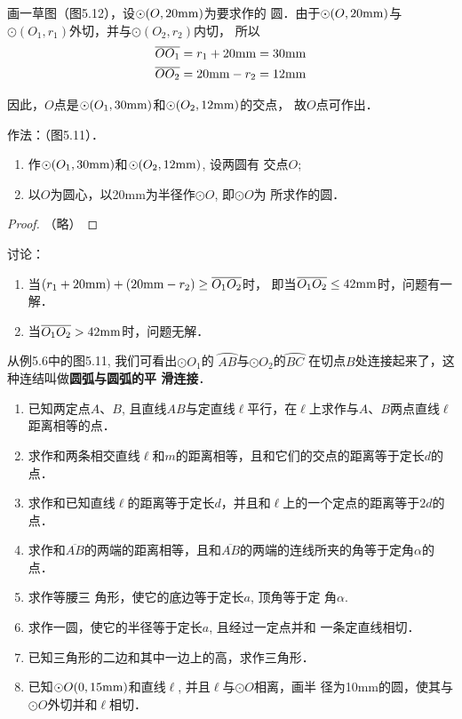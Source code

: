 \begin{analyze}
    画一草图（图5.12），设$\odot (O,20{\rm mm})$为要求作的
圆．由于$\odot (O,20{\rm mm})$与$\odot (O_1,r_1)$外切，并与$\odot (O_2,r_2)$内切，
所以
\[\begin{split}
   \overline{OO_1}&=r_1+20{\rm  mm}=30{\rm mm}\\
   \overline{OO_2}&=20{\rm  mm}-r_2=12{\rm  mm} 
\end{split}\]

因此，$O$点是$\odot (O_1,30{\rm mm})$和$\odot (O_2,12{\rm  mm})$的交点，
故$O$点可作出．
\end{analyze}

作法：（图5.11）．
\begin{enumerate}
    \item 作$\odot (O_1,30{\rm mm})$和$\odot (O_2,12{\rm mm})$, 设两圆有
交点$O$;
\item 以$O$为圆心，以20mm为半径作$\odot O$, 即$\odot O$为
所求作的圆．
\end{enumerate}

\begin{proof}
（略）
\end{proof}

讨论：
\begin{enumerate}
    \item 当$(r_1+20{\rm mm})+(20{\rm mm}-r_2)\ge \overline{O_1O_2}$时，
即当$ \overline{O_1O_2}\le 42{\rm mm}$时，问题有一解．
\item 当$ \overline{O_1O_2}> 42{\rm mm}$时，问题无解．
\end{enumerate}

从例5.6中的图5.11, 我们可看出$\odot O_1$的
$\wideparen{AB}$与$\odot O_2$的$\wideparen{BC}$
在切点$B$处连接起来了，这种连结叫做\textbf{圆弧与圆弧的平
滑连接}．

\begin{ex}
\begin{enumerate}
    \item 已知两定点$A$、$B$, 且直线$AB$与定直线$\ell$平行，在$\ell$上求作与$A$、$B$两点直线$\ell$距离相等的点．
    \item 求作和两条相交直线$\ell$和$m$的距离相等，且和它们的交点的距离等于定长$d$的点．
    \item 求作和已知直线$\ell$的距离等于定长$d$，并且和$\ell$上的一个定点的距离等于$2d$的点．
    \item 求作和$\overline{AB}$的两端的距离相等，且和$\overline{AB}$的两端的连线所夹的角等于定角$\alpha$的点．
    \item 求作等腰三
    角形，使它的底边等于定长$a$, 顶角等于定
    角$\alpha$.
    \item 求作一圆，使它的半径等于定长$a$, 且经过一定点并和
    一条定直线相切．
    \item 已知三角形的二边和其中一边上的高，求作三角形．
    \item 已知$\odot O(0,15{\rm mm})$和直线$\ell$, 并且$\ell$与$\odot O$相离，画半
    径为10mm的圆，使其与$\odot O$外切并和$\ell$相切．
\end{enumerate}
\end{ex}

